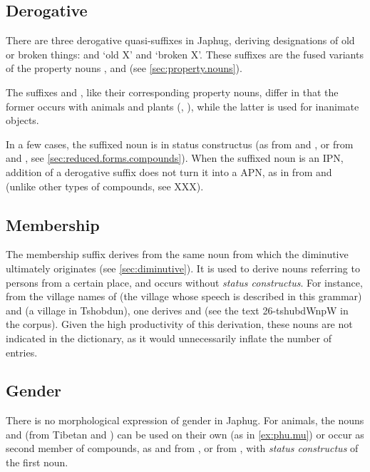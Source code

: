 \subsection{Derogative} \label{sec:derogative}
There are three derogative quasi-suffixes in Japhug, deriving designations of old or broken things:  and  `old X' and  `broken X'. These suffixes are the fused variants of the property nouns ,  and   (see \ref{sec:property.nouns}). 

The suffixes  and , like their corresponding property nouns, differ in that the former occurs with animals and plants (, ), while the latter is used for inanimate objects.

 In a few cases, the suffixed noun is in status constructus (as  from  and , or  from  and , see \ref{sec:reduced.forms.compounds}). When the suffixed noun is an IPN, addition of a derogative suffix does not turn it into a APN, as in  from  and  (unlike other types of compounds, see XXX).

\subsection{Membership} 
The membership suffix  derives from the same noun  from which the diminutive  ultimately originates (see \ref{sec:diminutive}). It is used to derive nouns referring to persons from a certain place, and occurs without \textit{status constructus}. For instance, from the village names of  (the village whose speech is described in this grammar) and  (a village in Tshobdun), one derives  and  (see the text 26-tshubdWnpW in the corpus). Given the high productivity of this derivation, these nouns are not indicated in the dictionary, as it would unnecessarily inflate the number of entries.

\subsection{Gender} \label{sec:gender}
There is no morphological expression of gender in Japhug. For animals, the nouns  and  (from Tibetan  and ) can be used on their own (as in \ref{ex:phu.mu}) or occur as second member of compounds, as  and  from , or  from , with \textit{status constructus} of the first noun.

